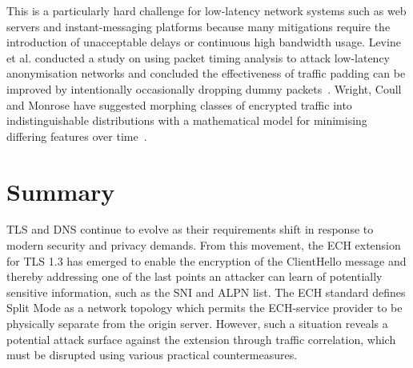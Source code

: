 This is a particularly hard challenge for low-latency network systems such as web servers and instant-messaging platforms because many mitigations require the introduction of unacceptable delays or continuous high bandwidth usage. Levine et al. conducted a study on using packet timing analysis to attack low-latency anonymisation networks and concluded the effectiveness of traffic padding can be improved by intentionally occasionally dropping dummy packets~\cite{levine2004timing}. Wright, Coull and Monrose have suggested morphing classes of encrypted traffic into indistinguishable distributions with a mathematical model for minimising differing features over time~\cite{wright2009traffic}.









\section{Summary}

TLS and DNS continue to evolve as their requirements shift in response to modern security and privacy demands. From this movement, the ECH extension for TLS 1.3 has emerged to enable the encryption of the ClientHello message and thereby addressing one of the last points an attacker can learn of potentially sensitive information, such as the SNI and ALPN list. The ECH standard defines Split Mode as a network topology which permits the ECH-service provider to be physically separate from the origin server. However, such a situation reveals a potential attack surface against the extension through traffic correlation, which must be disrupted using various practical countermeasures.
